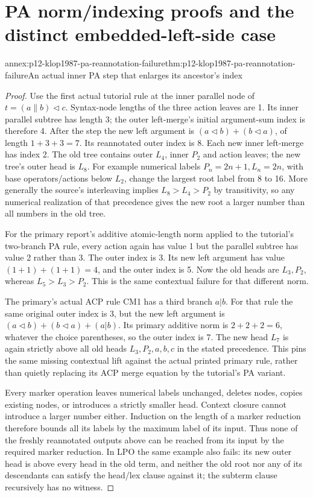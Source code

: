 \section{PA norm/indexing proofs and the distinct embedded-left-side case}

\begin{annexitem}{annex:p12-klop1987-pa-reannotation-failure}{thm:p12-klop1987-pa-reannotation-failure}{An actual inner PA step that enlarges its ancestor's index}
\begin{proof}
Use the first actual tutorial rule at the inner parallel node of
\(t=(a\parallel b)\lhd c\). Syntax-node lengths of the three
action leaves are 1. Its inner parallel subtree has length 3;
the outer left-merge's initial argument-sum index is therefore 4.
After the step the new left argument is
\((a\lhd b)+(b\lhd a)\), of length \(1+3+3=7\).
Its reannotated outer index is 8. Each new inner left-merge has
index 2. The old tree contains outer \(L_4\), inner \(P_2\)
and action leaves; the new tree's outer head is \(L_8\).
For example numerical labels \(P_n=2n+1,L_n=2n\), with
base operators/actions below \(L_2\), change the largest root
label from 8 to 16. More generally the source's interleaving implies
\(L_8>L_4>P_2\) by transitivity, so any numerical realization
of that precedence gives the new root a larger number than all
numbers in the old tree.

For the primary report's additive atomic-length norm applied to
the tutorial's two-branch PA rule, every action again has value 1
but the parallel subtree has value 2 rather than 3. The outer index
is 3. Its new left argument has value
\((1+1)+(1+1)=4\), and the outer index is 5. Now the old heads
are \(L_3,P_2\), whereas \(L_5>L_3>P_2\).
This is the same contextual failure for that different norm.

The primary's actual ACP rule CM1 has a third branch \(a|b\).
For that rule the same original outer index is 3, but the new left
argument is \((a\lhd b)+(b\lhd a)+(a|b)\). Its primary
additive norm is \(2+2+2=6\), whatever the choice parentheses,
so the outer index is 7. The new head \(L_7\) is again strictly
above all old heads \(L_3,P_2,a,b,c\) in the stated precedence.
This pins the same missing contextual lift against the actual
printed primary rule, rather than quietly replacing its ACP
merge equation by the tutorial's PA variant.

Every marker operation leaves numerical labels unchanged, deletes
nodes, copies existing nodes, or introduces a strictly smaller
head. Context closure cannot introduce a larger number either.
Induction on the length of a marker reduction therefore bounds
all its labels by the maximum label of its input. Thus none of the
freshly reannotated outputs above can be reached from its input by
the required marker reduction. In LPO the same example also fails:
its new outer head is above every head in the old term, and neither
the old root nor any of its descendants can satisfy the head/lex
clause against it; the subterm clause recursively has no witness.


\end{proof}
\end{annexitem}
